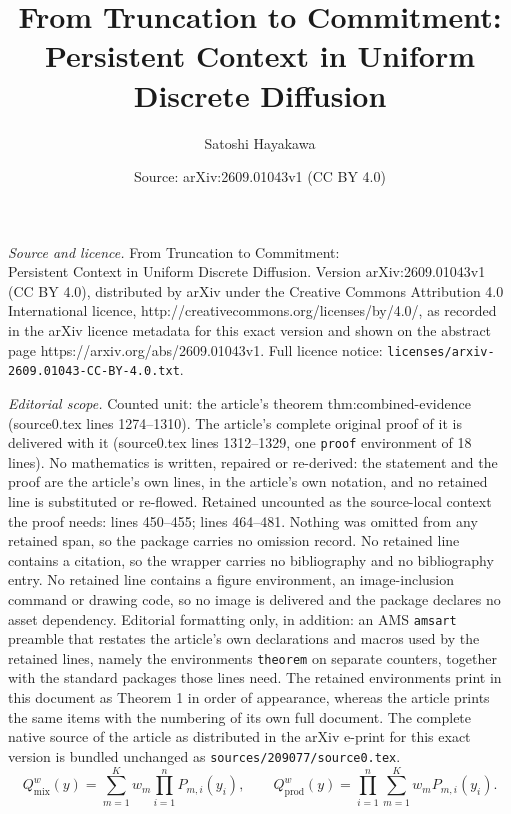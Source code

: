 \documentclass[10pt,a4paper]{amsart}
\title{From Truncation to Commitment:\\ Persistent Context in Uniform Discrete Diffusion}
\author{Satoshi Hayakawa}
\date{Source: arXiv:2609.01043v1 (CC BY 4.0)}
\begin{document}
\maketitle

\noindent\emph{Source and licence.} From Truncation to Commitment:\\ Persistent Context in Uniform Discrete Diffusion. Version arXiv:2609.01043v1 (CC BY 4.0), distributed by arXiv under the Creative Commons Attribution 4.0 International licence, http://creativecommons.org/licenses/by/4.0/, as recorded in the arXiv licence metadata for this exact version and shown on the abstract page https://arxiv.org/abs/2609.01043v1. Full licence notice: \texttt{licenses/arxiv-2609.01043-CC-BY-4.0.txt}.\par\smallskip

\noindent\textit{Editorial scope.} Counted unit: the article's theorem thm:combined-evidence (source0.tex lines 1274--1310). The article's complete original proof of it is delivered with it (source0.tex lines 1312--1329, one \texttt{proof} environment of 18 lines). No mathematics is written, repaired or re-derived: the statement and the proof are the article's own lines, in the article's own notation, and no retained line is substituted or re-flowed.  Retained uncounted as the source-local context the proof needs: lines 450--455; lines 464--481.  Nothing was omitted from any retained span, so the package carries no omission record.  No retained line contains a citation, so the wrapper carries no bibliography and no bibliography entry.  No retained line contains a figure environment, an image-inclusion command or drawing code, so no image is delivered and the package declares no asset dependency.  Editorial formatting only, in addition: an AMS \texttt{amsart} preamble that restates the article's own declarations and macros used by the retained lines, namely the environments \texttt{theorem} on separate counters, together with the standard packages those lines need.  The retained environments print in this document as Theorem 1 in order of appearance, whereas the article prints the same items with the numbering of its own full document.  The complete native source of the article as distributed in the arXiv e-print for this exact version is bundled unchanged as \texttt{sources/209077/source0.tex}.
\begin{equation}
 Q_{\mathrm{mix}}^w(y)=\sum_{m=1}^K w_m\prod_{i=1}^nP_{m,i}(y_i),
 \qquad
 Q_{\mathrm{prod}}^w(y)=\prod_{i=1}^n\sum_{m=1}^K w_mP_{m,i}(y_i).
 \label{eq:shared-mode-laws}
\end{equation}
\end{document}
